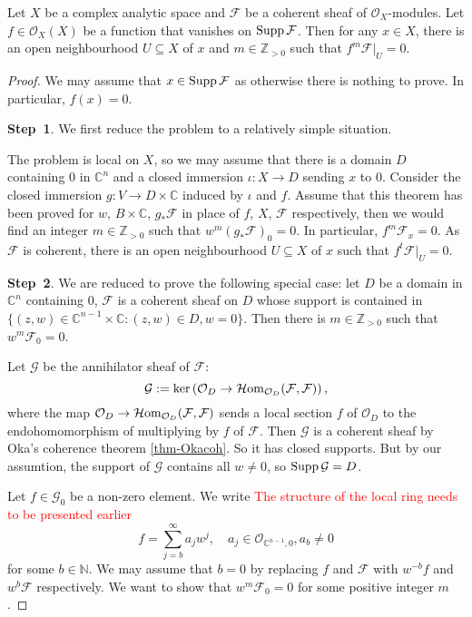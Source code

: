 \begin{theorem}
    Let $X$ be a complex analytic space and $\mathcal{F}$ be a coherent sheaf of $\mathcal{O}_X$-modules. Let $f\in \mathcal{O}_X(X)$ be a function that vanishes on $\operatorname{Supp} \mathcal{F}$. Then for any $x\in X$, there is an open neighbourhood $U\subseteq X$ of $x$ and $m\in \mathbb{Z}_{>0}$ such that $f^m\mathcal{F}|_U=0$.
\end{theorem}
\begin{proof}
    We may assume that $x\in \operatorname{Supp} \mathcal{F}$ as otherwise there is nothing to prove. In particular, $f(x)=0$.

    \textbf{Step~1}. We first reduce the problem to a relatively simple situation.

    The problem is local on $X$, so we may assume that there is a domain $D$ containing $0$ in $\mathbb{C}^n$ and a closed immersion $\iota:X\rightarrow D$ sending $x$ to $0$. Consider the closed immersion $g:V\rightarrow D\times \mathbb{C}$ induced by $\iota$ and $f$. Assume that this theorem has been proved for $w$, $B\times \mathbb{C}$, $g_*\mathcal{F}$ in place of $f$, $X$, $\mathcal{F}$ respectively, then we would find an integer $m\in \mathbb{Z}_{>0}$ such that $w^m(g_*\mathcal{F})_0=0$. In particular, $f^m\mathcal{F}_x=0$. As $\mathcal{F}$ is coherent, there is an open neighbourhood $U\subseteq X$ of $x$ such that $f^t\mathcal{F}|_U=0$.

    \textbf{Step~2}. We are reduced to prove the following special case: let $D$ be a domain in $\mathbb{C}^n$ containing $0$, $\mathcal{F}$ is a coherent sheaf on $D$ whose support is contained in $\{(z,w)\in \mathbb{C}^{n-1}\times \mathbb{C}:(z,w)\in D,w=0\}$. Then there is $m\in \mathbb{Z}_{>0}$ such that $w^m\mathcal{F}_0=0$.

    Let $\mathcal{G}$ be the annihilator sheaf of $\mathcal{F}$: 
    \[
       \mathcal{G}:=\ker \left(\mathcal{O}_D\rightarrow \operatorname{\mathcal{H}\mathrm{om}}_{\mathcal{O}_D}(\mathcal{F},\mathcal{F})\right),
    \]
    where the map $\mathcal{O}_D\rightarrow \operatorname{\mathcal{H}\mathrm{om}}_{\mathcal{O}_D}(\mathcal{F},\mathcal{F})$ sends a local section $f$ of $\mathcal{O}_D$ to the endohomomorphism of multiplying by $f$ of $\mathcal{F}$.
    Then $\mathcal{G}$ is a coherent sheaf by Oka's coherence theorem \cref{thm-Okacoh}. So it has closed supports. But by our assumtion, the support of $\mathcal{G}$ contains all $w\neq 0$, so $\operatorname{Supp} \mathcal{G}=D$.

    Let $f\in \mathcal{G}_0$ be a non-zero element. We write \textcolor{red}{The structure of the local ring needs to be presented earlier}
    \[
      f=\sum_{j=b}^{\infty}a_jw^j,\quad a_j\in \mathcal{O}_{\mathbb{C}^{n-1},0},a_b\neq 0
    \]
    for some $b\in \mathbb{N}$.
    We may assume that $b=0$ by replacing $f$ and $\mathcal{F}$ with $w^{-b}f$ and  $w^b\mathcal{F}$ respectively. We want to show that $w^m\mathcal{F}_0=0$ for some positive integer $m$. 
    

\end{proof}
